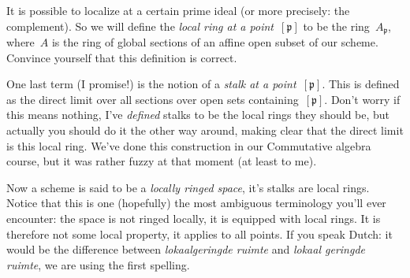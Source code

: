 It is possible to localize at a certain prime ideal (or more precisely: the complement). So we will define the \emph{local ring at a point~$[\mathfrak{p}]$} to be the ring~$A_{\mathfrak{p}}$, where~$A$ is the ring of global sections of an affine open subset of our scheme. Convince yourself that this definition is correct.

One last term (I promise!) is the notion of a \emph{stalk at a point~$[\mathfrak{p}]$}. This is defined as the direct limit over all sections over open sets containing~$[\mathfrak{p}]$. Don't worry if this means nothing, I've \emph{defined} stalks to be the local rings they should be, but actually you should do it the other way around, making clear that the direct limit is this local ring. We've done this construction in our Commutative algebra course, but it was rather fuzzy at that moment (at least to me).

Now a scheme is said to be a \emph{locally ringed space}, it's stalks are local rings. Notice that this is one (hopefully) the most ambiguous terminology you'll ever encounter: the space is not ringed locally, it is equipped with local rings. It is therefore not some local property, it applies to all points. If you speak Dutch: it would be the difference between \emph{lokaalgeringde ruimte} and \emph{lokaal geringde ruimte}, we are using the first spelling.
